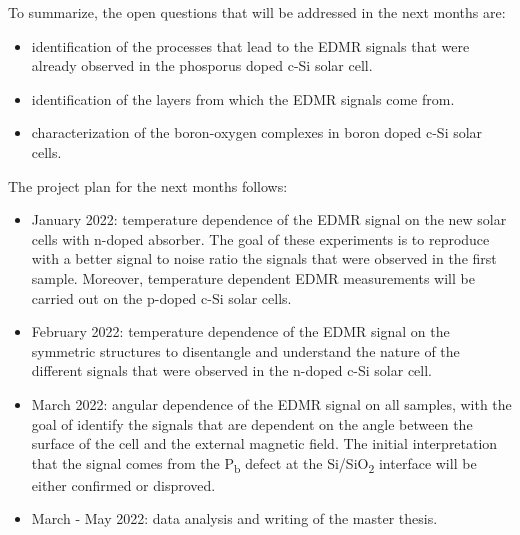 \documentclass[a4paper]{book}
\newcommand{\tsub}{\textsubscript}
\begin{document}
	To summarize, the open questions that will be addressed in the next months are:
	\begin{itemize}
		\item identification of the processes that lead to the EDMR signals that were already observed in the phosporus doped c-Si solar cell.
		\item identification of the layers from which the EDMR signals come from.
		\item characterization of the boron-oxygen complexes in boron doped c-Si solar cells.
	\end{itemize}
	The project plan for the next months follows:
	\begin{itemize}
		\item January 2022: temperature dependence of the EDMR signal on the new solar cells with n-doped absorber. The goal of these experiments is to reproduce with a better signal to noise ratio the signals that were observed in the first sample. Moreover, temperature dependent EDMR measurements will be carried out on the p-doped c-Si solar cells.
		\item February 2022: temperature dependence of the EDMR signal on the symmetric structures to disentangle and understand the nature of the different signals that were observed in the n-doped c-Si solar cell.
		\item March 2022: angular dependence of the EDMR signal on all samples, with the goal of identify the signals that are dependent on the angle between the surface of the cell and the external magnetic field. The initial interpretation that the signal comes from the P\tsub b defect at the Si/SiO\tsub 2 interface will be either confirmed or disproved.
		\item March - May 2022: data analysis and writing of the master thesis.		
	\end{itemize}
	
\end{document}
